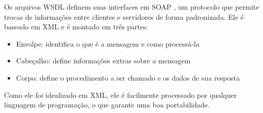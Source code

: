     Os arquivos WSDL definem suas interfaces em SOAP \cite{w3c-spec-soapspec}, um protocolo que permite trocas de informações entre clientes e servidores de forma padronizada. Ele é baseado em XML e é montado em três partes:
    \begin{itemize}
      \item Envolpe: identifica o que é a mensagem e como processá-la
      \item Cabeçalho: define informações extras sobre a mensagem
      \item Corpo: define o procedimento a ser chamado e os dados de sua resposta
    \end{itemize}

    Como ele foi idealizado em XML, ele é facilmente processado por qualquer linguagem de programação, o que garante uma boa portabilidade.
